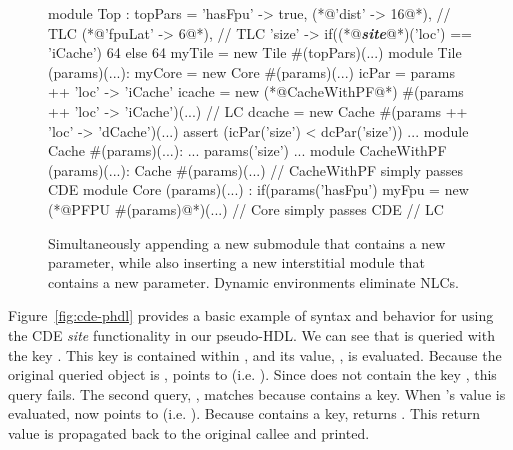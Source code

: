 \begin{figure}
\centering
\begin{phdl}
module Top :
  topPars = {'hasFpu' -> true,
             (*@\textcolor[rgb]{1,0,0}{'dist' -> 16}@*),                                   // TLC
             (*@\textcolor[rgb]{1,0,0}{'fpuLat' -> 6}@*),                                  // TLC
             'size' -> if((*@\textcolor[rgb]{1,0.5,0}{\textbf{\textit{site}}}@*)('loc') == 'iCache') 64 else 64 }
  myTile = new Tile #(topPars)(...)
module Tile (params)(...):
  myCore = new Core #(params)(...)
  icPar = params ++ {'loc' -> 'iCache'}                                                           
  icache = new (*@\textcolor[rgb]{1,0,0}{CacheWithPF}@*) #(params ++ {'loc' -> 'iCache'})(...) // LC
  dcache = new Cache #(params ++ {'loc' -> 'dCache'})(...)
  assert (icPar('size') < dcPar('size')) ...
module Cache #(params)(...):
  ... params('size') ...
module CacheWithPF (params)(...):
  Cache #(params)(...)        // CacheWithPF simply passes CDE
module Core (params)(...) :
  if(params('hasFpu') myFpu = new (*@\textcolor[rgb]{1,0,0}{PFPU \#(params)}@*)(...) // Core simply passes CDE  // LC
\end{phdl} 
\caption{Simultaneously appending a new submodule that contains a new parameter, while also inserting
a new interstitial module that contains a new parameter. Dynamic environments eliminate NLCs.}
\label{fig:cde-delta}
\end{figure}

Figure~\ref{fig:cde-phdl} provides a basic example of syntax and behavior for using the CDE {\em site} functionality in our pseudo-HDL.
We can see that  is queried with the key . 
This key is contained within , and its value, , is evaluated. 
Because the original queried object is ,  points to  (i.e. ). 
Since  does not contain the key , this query fails.
The second query, , matches because  contains a  key. 
When 's value is evaluated,  now points to  (i.e. ). 
Because  contains a  key,  returns . 
This return value is propagated back to the original  callee and printed.

